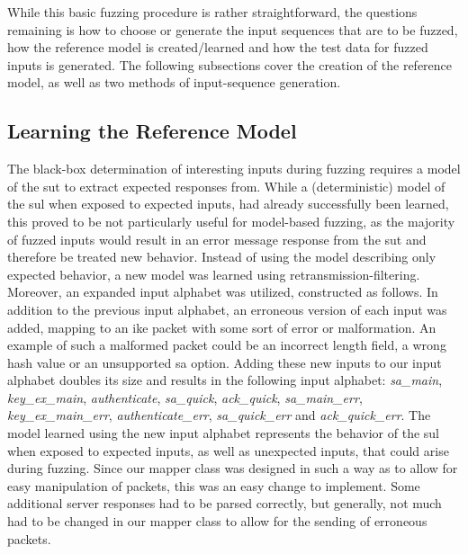 While this basic fuzzing procedure is rather straightforward, the questions remaining is how to choose or generate the input sequences that are to be fuzzed, how the reference model is created/learned and how the test data for fuzzed inputs is generated. The following subsections cover the creation of the reference model, as well as two methods of input-sequence generation.

\subsection{Learning the Reference Model} \label{subsec:adapting_model}
The black-box determination of interesting inputs during fuzzing requires a model of the \ac{sut} to extract expected responses from. While a (deterministic) model of the \ac{sul} when exposed to expected inputs, had already successfully been learned, this proved to be not particularly useful for model-based fuzzing, as the majority of fuzzed inputs would result in an error message response from the \ac{sut} and therefore be treated new behavior. Instead of using the model describing only expected behavior, a new model was learned  using retransmission-filtering. Moreover, an expanded input alphabet was utilized, constructed as follows. In addition to the previous input alphabet, an erroneous version of each input was added, mapping to an \ac{ike} packet with some sort of error or malformation. An example of such a malformed packet could be an incorrect length field, a wrong hash value or an unsupported \ac{sa} option. Adding these new inputs to our input alphabet doubles its size and results in the following input alphabet: \emph{sa\_main}, \emph{key\_ex\_main}, \emph{authenticate}, \emph{sa\_quick}, \emph{ack\_quick}, \emph{sa\_main\_err}, \emph{key\_ex\_main\_err}, \emph{authenticate\_err}, \emph{sa\_quick\_err} and \emph{ack\_quick\_err}. The model learned using the new input alphabet represents the behavior of the \ac{sul} when exposed to expected inputs, as well as unexpected inputs, that could arise during fuzzing. Since our mapper class was designed in such a way as to allow for easy manipulation of packets, this was an easy change to implement. Some additional server responses had to be parsed correctly, but generally, not much had to be changed in our mapper class to allow for the sending of erroneous packets. 


